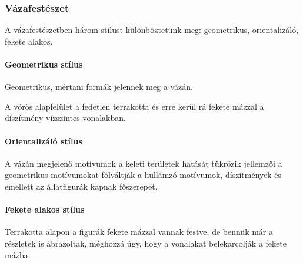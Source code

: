 \subsubsection{Vázafestészet}

A vázafestészetben három stílust különböztetünk meg: geometrikus, orientalizáló, fekete alakos.

\paragraph{Geometrikus stílus}
Geometrikus, mértani formák jelennek meg a vázán.

\clearpage 

A vörös alapfelület a fedetlen terrakotta és erre kerül rá fekete mázzal a díszítmény vízszintes vonalakban.

\paragraph{Orientalizáló stílus}
A vázán megjelenő motívumok a keleti területek hatását tükrözik jellemzői a geometrikus motívumokat fölváltják a hullámzó motívumok, díszítmények és emellett az állatfigurák kapnak főszerepet.

\paragraph{Fekete alakos stílus}
Terrakotta alapon a figurák fekete mázzal vannak festve, de bennük már a részletek is ábrázoltak, méghozzá úgy, hogy a vonalakat belekarcolják a fekete mázba.

\begin{figure}[!h]
	\begin{minipage}{0.23\textwidth}
	\end{minipage}
	\hfill
	\begin{minipage}{0.33\textwidth}
	\end{minipage}	
	\hfill
	\begin{minipage}{0.39\textwidth}
	\end{minipage}
	\captionsetup{labelformat=empty}
	\caption{}
\end{figure}

